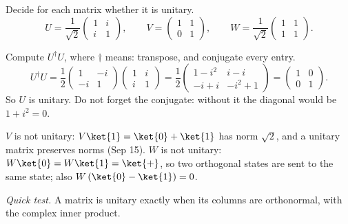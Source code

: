 \begin{exercisebox}
\begin{pproblem}\label{pp:unitary}
    Decide for each matrix whether it is unitary.
    \[U = \frac{1}{\sqrt{2}} \begin{pmatrix} 1 & i \\ i & 1 \end{pmatrix},
        \qquad
        V = \begin{pmatrix} 1 & 1 \\ 0 & 1 \end{pmatrix},
        \qquad
        W = \frac{1}{\sqrt{2}} \begin{pmatrix} 1 & 1 \\ 1 & 1 \end{pmatrix}.\]
\end{pproblem}
\tcblower
\begin{wsolution}
    Compute $U^\dagger U$, where $\dagger$ means: transpose, and conjugate every entry.
    \[U^\dagger U = \frac{1}{2} \begin{pmatrix} 1 & -i \\ -i & 1 \end{pmatrix} \begin{pmatrix} 1 & i \\ i & 1 \end{pmatrix}
        = \frac{1}{2} \begin{pmatrix} 1 - i^2 & i - i \\ -i + i & -i^2 + 1 \end{pmatrix}
        = \begin{pmatrix} 1 & 0 \\ 0 & 1 \end{pmatrix}.\]
    So $U$ is unitary. Do not forget the conjugate: without it the diagonal would be $1 + i^2 = 0$.

    $V$ is not unitary: $V\ket{1} = \ket{0} + \ket{1}$ has norm $\sqrt{2}$, and a unitary matrix
    preserves norms (Sep 15). $W$ is not unitary: $W\ket{0} = W\ket{1} = \ket{+}$, so two orthogonal
    states are sent to the same state; also $W\left(\ket{0} - \ket{1}\right) = 0$.

    \emph{Quick test.} A matrix is unitary exactly when its columns are orthonormal, with the
    complex inner product.
\end{wsolution}
\end{exercisebox}
